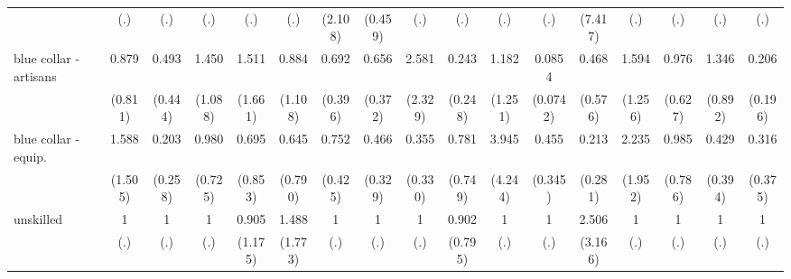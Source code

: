 {\begin{tabular}{l*{16}{c}}
                    &         (.)         &         (.)         &         (.)         &         (.)         &         (.)         &     (2.108)         &     (0.459)         &         (.)         &         (.)         &         (.)         &         (.)         &     (7.417)         &         (.)         &         (.)         &         (.)         &         (.)         \\
[1em]
blue collar - artisans&       0.879         &       0.493         &       1.450         &       1.511         &       0.884         &       0.692         &       0.656         &       2.581         &       0.243         &       1.182         &      0.0854\sym{**} &       0.468         &       1.594         &       0.976         &       1.346         &       0.206         \\
                    &     (0.811)         &     (0.444)         &     (1.088)         &     (1.661)         &     (1.108)         &     (0.396)         &     (0.372)         &     (2.329)         &     (0.248)         &     (1.251)         &    (0.0742)         &     (0.576)         &     (1.256)         &     (0.627)         &     (0.892)         &     (0.196)         \\
[1em]
blue collar - equip.&       1.588         &       0.203         &       0.980         &       0.695         &       0.645         &       0.752         &       0.466         &       0.355         &       0.781         &       3.945         &       0.455         &       0.213         &       2.235         &       0.985         &       0.429         &       0.316         \\
                    &     (1.505)         &     (0.258)         &     (0.725)         &     (0.853)         &     (0.790)         &     (0.425)         &     (0.329)         &     (0.330)         &     (0.749)         &     (4.244)         &     (0.345)         &     (0.281)         &     (1.952)         &     (0.786)         &     (0.394)         &     (0.375)         \\
[1em]
unskilled           &           1         &           1         &           1         &       0.905         &       1.488         &           1         &           1         &           1         &       0.902         &           1         &           1         &       2.506         &           1         &           1         &           1         &           1         \\
                    &         (.)         &         (.)         &         (.)         &     (1.175)         &     (1.773)         &         (.)         &         (.)         &         (.)         &     (0.795)         &         (.)         &         (.)         &     (3.166)         &         (.)         &         (.)         &         (.)         &         (.)         \\

\end{tabular}}

